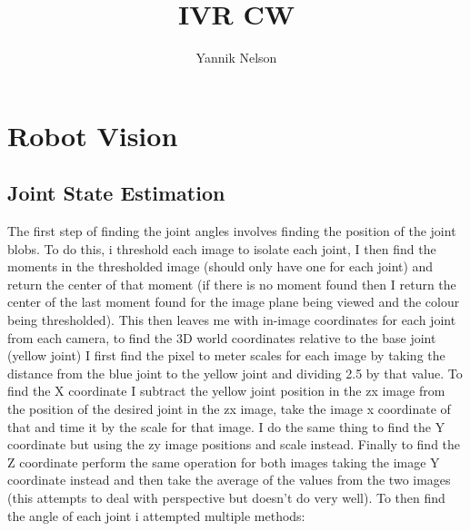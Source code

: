 \documentclass[12pt]{article}
\title{IVR CW}
\author{Yannik Nelson}
\begin{document}
\maketitle
\tableofcontents \newpage

\section{Robot Vision}
\subsection{Joint State Estimation}
The first step of finding the joint angles involves finding the position of the joint blobs. To do this, i threshold each image to isolate each joint, I then find the moments in the thresholded image (should only have one for each joint) and return the center of that moment (if there is no moment found then I return the center of the last moment found for the image plane being viewed and the colour being thresholded).
\newline \newline
This then leaves me with in-image coordinates for each joint from each camera, to find the 3D world coordinates relative to the base joint (yellow joint) I first find the pixel to meter scales for each image by taking the distance from the blue joint to the yellow joint and dividing 2.5 by that value. To find the X coordinate I subtract the yellow joint position in the zx image from the position of the desired joint in the zx image, take the image x coordinate of that and time it by the scale for that image. I do the same thing to find the Y coordinate but using the zy image positions and scale instead. Finally to find the Z coordinate perform the same operation for both images taking the image Y coordinate instead and then take the average of the values from the two images (this attempts to deal with perspective but doesn't do very well).
\newline \newline
To then find the angle of each joint i attempted multiple methods:
\end{document}
